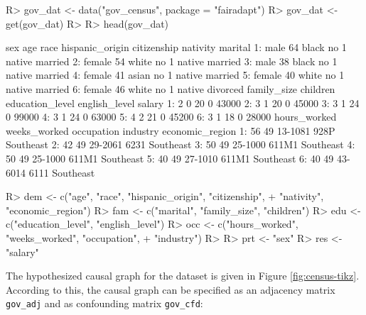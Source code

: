 \documentclass[
  nojss]{jss}
\begin{document}
\begin{CodeChunk}
\begin{CodeInput}
R> gov_dat <- data("gov_census", package = "fairadapt")
R> gov_dat <- get(gov_dat)
R> 
R> head(gov_dat)
\end{CodeInput}
\begin{CodeOutput}
      sex age  race hispanic_origin citizenship nativity  marital
1:   male  64 black              no           1   native  married
2: female  54 white              no           1   native  married
3:   male  38 black              no           1   native  married
4: female  41 asian              no           1   native  married
5: female  40 white              no           1   native  married
6: female  46 white              no           1   native divorced
   family_size children education_level english_level salary
1:           2        0              20             0  43000
2:           3        1              20             0  45000
3:           3        1              24             0  99000
4:           3        1              24             0  63000
5:           4        2              21             0  45200
6:           3        1              18             0  28000
   hours_worked weeks_worked occupation industry economic_region
1:           56           49    13-1081     928P       Southeast
2:           42           49    29-2061     6231       Southeast
3:           50           49    25-1000    611M1       Southeast
4:           50           49    25-1000    611M1       Southeast
5:           40           49    27-1010    611M1       Southeast
6:           40           49    43-6014     6111       Southeast
\end{CodeOutput}
\begin{CodeInput}
R> dem <- c("age", "race", "hispanic_origin", "citizenship",
+          "nativity", "economic_region")
R> fam <- c("marital", "family_size", "children")
R> edu <- c("education_level", "english_level")
R> occ <- c("hours_worked", "weeks_worked", "occupation",
+          "industry")
R> 
R> prt <- "sex"
R> res <- "salary"
\end{CodeInput}
\end{CodeChunk}

The hypothesized causal graph for the dataset is given in Figure
\ref{fig:census-tikz}. According to this, the causal graph can be
specified as an adjacency matrix \texttt{gov\_adj} and as confounding
matrix \texttt{gov\_cfd}:
\end{document}
